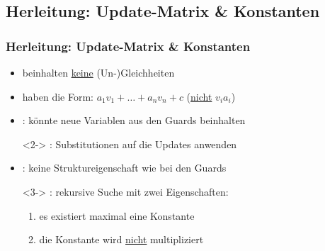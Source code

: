 \subsection{Herleitung: Update-Matrix \& Konstanten}
\begin{frame}
	\frametitle{Herleitung: Update-Matrix \& Konstanten}
	\begin{itemize}
		\item beinhalten \underline{keine} (Un-)Gleichheiten
		\item haben die Form: $a_1 v_1 + \dots + a_n v_n + c$ (\underline{nicht} $v_i a_i$)
		\item {}: k\"onnte \glqq neue\grqq\xspace Variablen aus den Guards beinhalten
		\item[]<2-> : Substitutionen auf die Updates anwenden
		\item<2-> : keine Struktureigenschaft wie bei den Guards
		\item[]<3-> : rekursive Suche mit zwei Eigenschaften:
			\begin{enumerate}
				\item es existiert maximal eine Konstante
				\item die Konstante wird \underline{nicht} multipliziert
			\end{enumerate}
	\end{itemize}
\end{frame}

